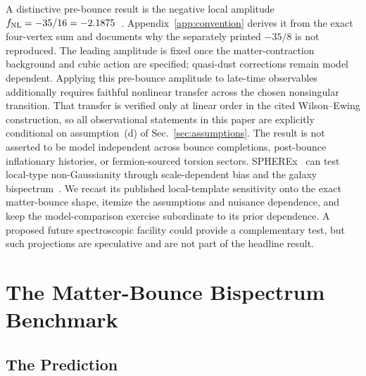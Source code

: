 \documentclass[aps,prd,twocolumn,superscriptaddress,showpacs,preprintnumbers,nofootinbib,longbibliography,floatfix]{revtex4-2}
\newcommand{\fnl}{f_{\rm NL}}
\begin{document}
A distinctive pre-bounce result is the negative local amplitude $\fnl=-35/16=-2.1875$~\cite{Cai:2009fn,LiQuintin:2017,Wands:2010}. Appendix~\ref{app:convention} derives it from the exact four-vertex sum and documents why the separately printed $-35/8$ is not reproduced. The leading amplitude is fixed once the matter-contraction background and cubic action are specified; quasi-dust corrections remain model dependent. Applying this pre-bounce amplitude to late-time observables additionally requires faithful nonlinear transfer across the chosen nonsingular transition. That transfer is verified only at linear order in the cited Wilson--Ewing construction, so all observational statements in this paper are explicitly conditional on assumption~(d) of Sec.~\ref{sec:assumptions}. The result is not asserted to be model independent across bounce completions, post-bounce inflationary histories, or fermion-sourced torsion sectors.
SPHEREx~\cite{Dore:2014} can test local-type non-Gaussianity through scale-dependent bias and the galaxy bispectrum~\cite{Dalal:2007cu,Heinrich:2023}. We recast its published local-template sensitivity onto the exact matter-bounce shape, itemize the assumptions and nuisance dependence, and keep the model-comparison exercise subordinate to its prior dependence. A proposed future spectroscopic facility could provide a complementary test, but such projections are speculative and are not part of the headline result.
\section{The Matter-Bounce Bispectrum Benchmark}
\label{sec:benchmark}

\subsection{The Prediction}
\end{document}
